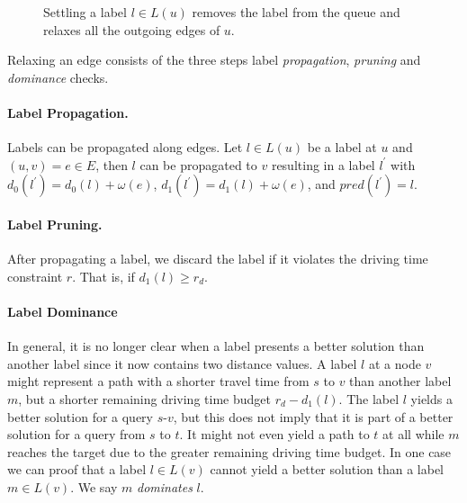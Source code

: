 \begin{figure}[hbtp]
	\setlength{\interspacetitleruled}{0pt}%
	\setlength{\algotitleheightrule}{0pt}%
	\begin{algorithm*}[H]
		\DontPrintSemicolon


	\end{algorithm*}
	\setlength{\interspacetitleruled}{2pt}%
	\setlength{\algotitleheightrule}{\algotitleheightruledefault}%

	\caption{\label{alg:settle_next_label}Settling a label $l \in L(u)$ removes the label from the queue and relaxes all the outgoing edges of $u$.}
\end{figure}

Relaxing an edge consists of the three steps label \emph{propagation}, \emph{pruning} and \emph{dominance} checks.

\paragraph{Label Propagation.}
Labels can be propagated along edges. Let $l \in L(u)$ be a label at $u$ and $(u,v) = e \in E$, then $l$ can be propagated to $v$ resulting in a label $l^{'}$ with $d_0(l^{'}) = d_0(l) + \omega(e)$, $d_1(l^{'}) = d_1(l) + \omega(e)$, and $pred(l^{'}) = l$.

\paragraph{Label Pruning.}
After propagating a label, we discard the label if it violates the driving time constraint $r$. That is, if $d_1(l) \ge r_d$.


\paragraph{Label Dominance}
In general, it is no longer clear when a label presents a better solution than another label since it now contains two distance values. A label $l$ at a node $v$ might represent a path with a shorter travel time from $s$ to $v$ than another label $m$, but a shorter remaining driving time budget $r_d - d_1(l)$. The label $l$ yields a better solution for a query $s$-$v$, but this does not imply that it is part of a better solution for a query from $s$ to $t$. It might not even yield a path to $t$ at all while $m$ reaches the target due to the greater remaining driving time budget. In one case we can proof that a label $l \in L(v)$ cannot yield a better solution than a label $m \in L(v)$. We say $m$ \emph{dominates} $l$.

